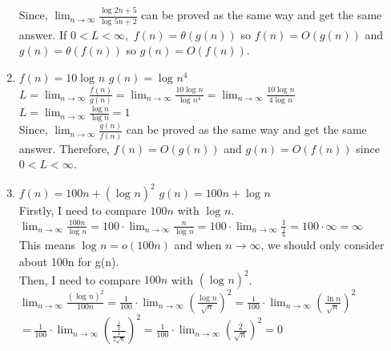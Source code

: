 \documentclass[12pt]{article}
\begin{document}
\begin{enumerate}[label=(\alph*)]
    Since, $\lim_{n\to\infty} \frac{\log_{}{2n + 5}}{\log_{}{5n + 2}}$ can be proved as the same way and get the same answer.
    If $0 < L < \infty,$ $f(n) = \theta(g(n))$ so $f(n) = O(g(n)) $ and $ g(n) = \theta(f(n))$ so $g(n) = O(f(n)) $.
  \item $f(n) = 10\log_{}{n}$ \hspace{1cm} $g(n) = \log_{}{n^4}$ \vspace{1mm} \\
    $L = \lim_{n\to\infty} \frac{f(n)}{g(n)} = \lim_{n\to\infty} \frac{10\log_{}{n}}{\log_{}{n^4}} = \lim_{n\to\infty} \frac{10\log_{}{n}}{4\log_{}{n}} $ \vspace{1mm} \\
    $L = \lim_{n\to\infty} \frac{\log{}{n}}{\log{}{n}} = 1 $\vspace{2mm} \vspace{1mm} \\
    Since, $\lim_{n\to\infty} \frac{g(n)}{f(n)}$ can be proved as the same way and get the same answer. Therefore, $f(n) = O(g(n)) $ and $g(n) = O(f(n)) $ since $0 < L < \infty$. 
  \item $f(n) = 100n + (\log_{}{n})^2$ \hspace{1cm} $g(n) = 100n + \log_{}{n}$ \vspace{1mm} \\
    Firstly, I need to compare $100n$ with $\log_{}{n}$. \vspace{1mm} \\
    $\lim_{n\to\infty} \frac{100n}{\log_{}{n}} = 100\cdot\lim_{n\to\infty} \frac{n}{\log_{}{n}} = 100\cdot\lim_{n\to\infty} \frac{1}{\frac{1}{n}} = 100\cdot\infty = \infty$ \vspace{1mm} \\
    This means $\log_{}{n} = o(100n)$ and when $n\rightarrow\infty$, we should only consider about 100n for g(n). \vspace{1mm} \\
    Then, I need to compare $100n$ with $(\log_{}{n})^2$. \vspace{1mm} \\
    $\lim_{n\to\infty} \frac{(\log_{}{n})^2}{100n} = \frac{1}{100} \cdot \lim_{n\to\infty}(\frac{\log{}{n}}{\sqrt{n}})^2 = \frac{1}{100} \cdot \lim_{n\to\infty}(\frac{\ln{n}}{\sqrt{n}})^2$  \vspace{1mm} \\
    $=\frac{1}{100} \cdot \lim_{n\to\infty}(\frac{\frac{1}{x}}{\frac{1}{2\sqrt{n}}})^2 = \frac{1}{100} \cdot \lim_{n\to\infty}(\frac{2}{\sqrt{n}})^2 = 0$ \vspace{1mm} \\

\end{enumerate}
\end{document}
